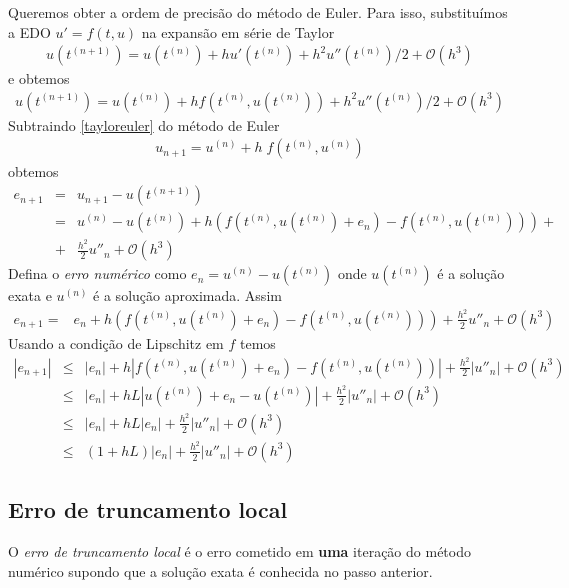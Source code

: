 Queremos obter a ordem de precisão do método de Euler. Para isso, substituímos a EDO $u'=f(t,u)$ na expansão em série de Taylor
\begin{eqnarray}\label{taylor}
   u(t^{(n+1)})=u(t^{(n)})+hu'(t^{(n)})+h^2u''(t^{(n)})/2+ \mathcal O(h^3)
\end{eqnarray}
e obtemos
\begin{eqnarray}\label{tayloreuler}
 u(t^{(n+1)})=u(t^{(n)})+hf(t^{(n)},u(t^{(n)}))+h^2u''(t^{(n)})/2+ \mathcal O(h^3)
\end{eqnarray}
Subtraindo \eqref{tayloreuler} do método de Euler
\begin{eqnarray}
    u_{n+1}=u^{(n)} + h\;f(t^{(n)},u^{(n)})
\end{eqnarray}
obtemos
\begin{eqnarray}
   e_{n+1}   &=& u_{n+1}-u(t^{(n+1)}) \\
             &=&u^{(n)} - u(t^{(n)})  +h(f(t^{(n)},u(t^{(n)})+e_n)- f(t^{(n)},u(t^{(n)}))) +\\
             &+&\frac{h^2}{2}u''_n+\mathcal O(h^3)
\end{eqnarray}
Defina o \emph{erro numérico} como $e_n=u^{(n)}-u(t^{(n)})$ onde $u(t^{(n)})$ é a solução exata e $u^{(n)}$ é a solução aproximada. Assim
\begin{eqnarray}
   e_{n+1}    =&e_n + h(f(t^{(n)},u(t^{(n)})+e_n)- f(t^{(n)},u(t^{(n)}))) +\frac{h^2}{2}u''_n+\mathcal O(h^3)
\end{eqnarray}
Usando a condição de Lipschitz em $f$  temos
\begin{eqnarray}
   |e_{n+1}|      &\le &  |e_n| + h|f(t^{(n)},u(t^{(n)})+e_n)- f(t^{(n)},u(t^{(n)}))|+\frac{h^2}{2}|u''_n|+\mathcal O(h^3)\\
                  &\le &  |e_n| + hL |u(t^{(n)})+e_n- u(t^{(n)})|+\frac{h^2}{2}|u''_n|+\mathcal O(h^3)\\
                  &\le &  |e_n| + hL |e_n|+\frac{h^2}{2}|u''_n|+\mathcal O(h^3)\\
                  &\le &  (1+ hL) |e_n|+\frac{h^2}{2}|u''_n|+\mathcal O(h^3)
\end{eqnarray}

\subsection{Erro de truncamento local}

O \emph{erro de truncamento local} é o erro cometido em \textbf{uma} iteração do método numérico supondo que a solução exata é conhecida no passo anterior.

